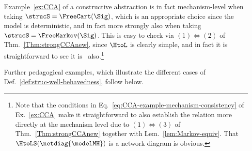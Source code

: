 \documentclass{article}
\begin{document}
\begin{example}
Example~\ref{ex:CCA} of a constructive abstraction is in fact mechanism-level when taking $\strucS = \FreeCart(\Sig)$, which is an appropriate choice since the model is deterministic, and in fact more strongly also when taking $\strucS = \FreeMarkov(\Sig)$. This is easy to check via $(1) \Leftrightarrow (2)$ of Thm.~\ref{Thm:strongCCAnew}, since $\HtoL$ is clearly simple, and in fact it is straightforward to see it is \extrastrong~also.\footnote{Note that the conditions in Eq.~\eqref{eq:CCA-example-mechanism-consistency} of Ex.~\ref{ex:CCA} make it straightforward to also establish the relation more directly at the mechanism level due to $(1) \Leftrightarrow (3)$ of Thm.~\ref{Thm:strongCCAnew} together with Lem.~\ref{lem:Markov-equiv}. That $\HtoLS(\netdiag{\modelMH})$ is a network diagram is obvious.} 
\end{example}

Further pedagogical examples, which illustrate the different cases of Def.~\ref{def:struc-well-behavedness}, follow below.
\end{document}
